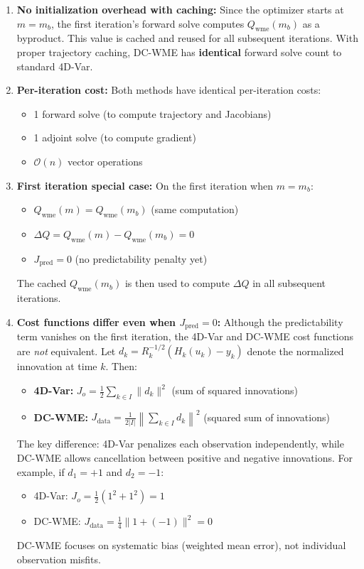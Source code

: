 \documentclass[11pt]{article}
\newcommand{\mb}{m_b}
\newcommand{\Rsqrtinv}{R^{-1/2}}
\newcommand{\Qwme}{Q_{\text{wme}}}
\begin{document}
\begin{enumerate}
    \item \textbf{No initialization overhead with caching:} Since the optimizer starts at $m = \mb$, the first iteration's forward solve computes $\Qwme(\mb)$ as a byproduct. This value is cached and reused for all subsequent iterations. With proper trajectory caching, DC-WME has \textbf{identical} forward solve count to standard 4D-Var.

    \item \textbf{Per-iteration cost:} Both methods have identical per-iteration costs:
    \begin{itemize}
        \item 1 forward solve (to compute trajectory and Jacobians)
        \item 1 adjoint solve (to compute gradient)
        \item $\mathcal{O}(n)$ vector operations
    \end{itemize}

    \item \textbf{First iteration special case:} On the first iteration when $m = \mb$:
    \begin{itemize}
        \item $\Qwme(m) = \Qwme(\mb)$ (same computation)
        \item $\Delta Q = \Qwme(m) - \Qwme(\mb) = 0$
        \item $J_{\text{pred}} = 0$ (no predictability penalty yet)
    \end{itemize}
    The cached $\Qwme(\mb)$ is then used to compute $\Delta Q$ in all subsequent iterations.

    \item \textbf{Cost functions differ even when $J_{\text{pred}} = 0$:} Although the predictability term vanishes on the first iteration, the 4D-Var and DC-WME cost functions are \textit{not} equivalent. Let $d_k = \Rsqrtinv_k(H_k(u_k) - y_k)$ denote the normalized innovation at time $k$. Then:
    \begin{itemize}
        \item \textbf{4D-Var:} $J_o = \frac{1}{2}\sum_{k \in I} \|d_k\|^2$ \quad (sum of squared innovations)
        \item \textbf{DC-WME:} $J_{\text{data}} = \frac{1}{2|I|}\left\|\sum_{k \in I} d_k\right\|^2$ \quad (squared sum of innovations)
    \end{itemize}
    The key difference: 4D-Var penalizes each observation independently, while DC-WME allows cancellation between positive and negative innovations. For example, if $d_1 = +1$ and $d_2 = -1$:
    \begin{itemize}
        \item 4D-Var: $J_o = \frac{1}{2}(1^2 + 1^2) = 1$
        \item DC-WME: $J_{\text{data}} = \frac{1}{4}\|1 + (-1)\|^2 = 0$
    \end{itemize}
    DC-WME focuses on systematic bias (weighted mean error), not individual observation misfits.


\end{enumerate}
\end{document}
